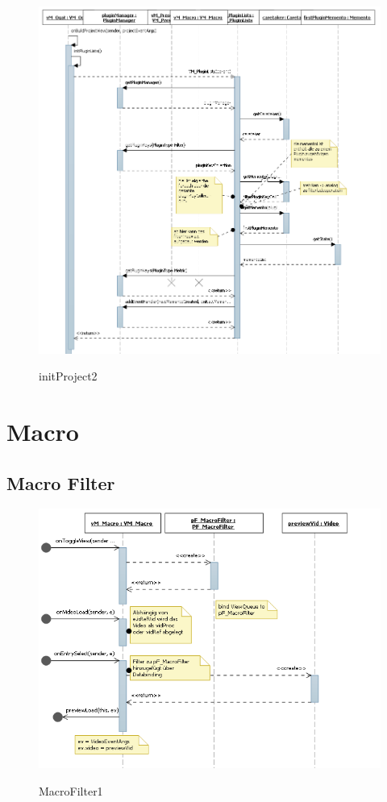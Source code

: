 \begin{figure}[h]
\includegraphics[width=\linewidth]{bilder/Sequenzdiagramm/initProject2.png}
\label{}
\caption{initProject2}
\end{figure}

\newpage
\section{Macro}
\subsection{Macro Filter}
\begin{figure}[h]
\includegraphics[width=\linewidth]{bilder/Sequenzdiagramm/Macro1.png}
\label{}
\caption{MacroFilter1}
\end{figure}

